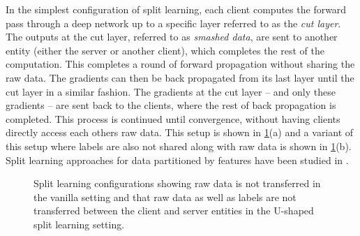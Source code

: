 \documentclass[11pt]{article}
\begin{document}
In the simplest configuration of split learning, each client computes the forward pass through a deep network up to a specific layer referred to as the \emph{cut layer}. The outputs at the cut layer, referred to as \emph{smashed data}, are sent to another entity (either the server or another client), which completes the rest of the computation. This completes a round of forward propagation without sharing the raw data. The gradients can then be back propagated from its last layer until the cut layer in a similar fashion. The gradients at the cut layer -- and only these gradients -- are sent back to the clients, where the rest of back propagation is completed. This process is continued until convergence, without having clients directly access each others raw data. This setup is shown in \cref{splitConfig}(a) and a variant of this setup where labels are also not shared along with raw data is shown in \cref{splitConfig}(b). Split learning approaches for data partitioned by features have been studied in \cite{splitVertical}.

\begin{figure}[!htbp]%
    \centering
    \qquad
    \caption{Split learning configurations showing raw data is not transferred in the vanilla setting and that raw data as well as labels are not transferred between the client and server  entities in the U-shaped split learning setting.}
\label{splitConfig}
\end{figure}
\end{document}
